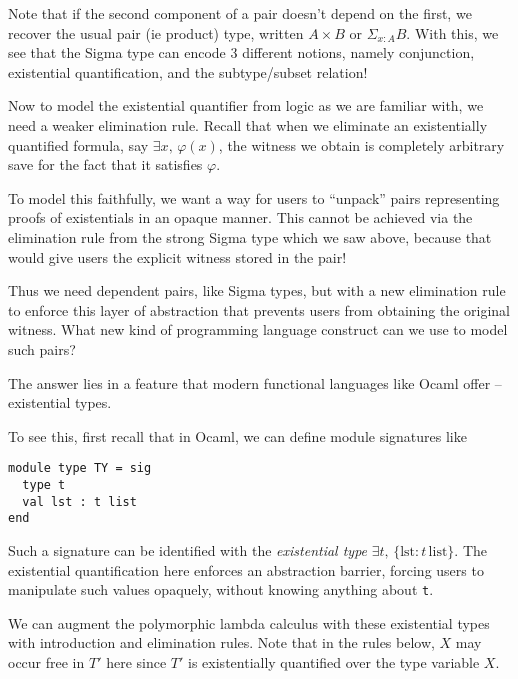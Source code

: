 \documentclass{article}
\begin{document}
Note that if the second component of a pair doesn't depend on the first, we recover
the usual pair (ie product) type, written $A \times B$ or $\Sigma_{x : A} B$.
With this, we see that the Sigma type can encode 3 different notions, namely
conjunction, existential quantification, and the subtype/subset relation!

Now to model the existential quantifier from logic as we are familiar with, we
need a weaker elimination rule.
Recall that when we eliminate an existentially quantified formula, say
$\exists x, \, \varphi(x)$, the witness we obtain is completely arbitrary save
for the fact that it satisfies $\varphi$.

To model this faithfully, we want a way for users to ``unpack'' pairs
representing proofs of existentials in an opaque manner.
This cannot be achieved via the elimination rule from the
strong  Sigma type which we saw above, because that would give users the explicit witness
stored in the pair!

Thus we need dependent pairs, like Sigma types, but with a new elimination rule
to enforce this layer of abstraction that prevents users from obtaining the
original witness. What new kind of programming language construct can we use to
model such pairs?

The answer lies in a feature that modern functional languages like Ocaml offer
-- existential types. 

To see this, first recall that in Ocaml, we can define module signatures like

\begin{verbatim}
module type TY = sig
  type t
  val lst : t list
end
\end{verbatim}

Such a signature can be identified with the \textit{existential type}
$\exists t, \, \{ \text{lst} : t \, \text{list} \}$.
The existential quantification here enforces an abstraction barrier, forcing
users to manipulate such values opaquely, without knowing anything about \verb|t|.

We can augment the polymorphic lambda calculus with these existential types
with introduction and elimination rules.
Note that in the rules below, $X$ may occur free in $T'$ here since $T'$ is
existentially quantified over the type variable $X$.
\end{document}
